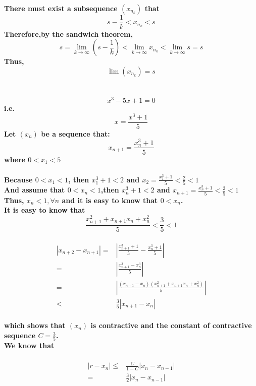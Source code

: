 \documentclass{article}
\begin{document}
        \paragraph{
            There must exist a subsequence $(x_{n_k})$
            that
            $$s-\frac{1}{k}<x_{n_k}<s$$
            Therefore,by the sandwich theorem,
            $$s=\lim_{k\rightarrow \infty} (s-\frac{1}{k})<\lim_{k\rightarrow \infty}x_{n_k}<\lim_{k\rightarrow \infty}s=s$$
            Thus,
            $$\lim(x_{n_k})=s$$
        }
    \section{}
        \paragraph{
            $$x^3-5x+1=0$$
            i.e.
            $$x=\frac{x^3+1}{5}$$
            Let $(x_n)$ be a sequence that:
            $$x_{n+1}=\frac{x_n^3+1}{5}$$
            where $0<x_1<5$
        }
        \paragraph{
            Because $0<x_1<1$, then $x_1^3+1<2$ and $x_{2}=\frac{x_1^3+1}{5}<\frac{2}{5}<1$\\
            And assume that $0<x_n<1$,then $x_n^3+1<2$ and $x_{n+1}=\frac{x_n^3+1}{5}<\frac{2}{5}<1$\\
            Thus, $x_n<1,\forall n$ and it is easy to know that $0<x_n$.\\
            It is easy to know that 
            $$\frac{x_{n+1}^2+x_{n+1}x_n+x_n^2}{5}<\frac{3}{5}<1$$
        }
            \begin{equation*}
                \begin{split}
                    |x_{n+2}-x_{n+1}|=&|\frac{x_{n+1}^3+1}{5}-\frac{x_n^3+1}{5}|\\
                        =&|\frac{x_{n+1}^3-x_n^3}{5}|\\
                        =&|\frac{(x_{n+1}-x_n)(x_{n+1}^2+x_{n+1}x_n+x_n^2)}{5}| \\ 
                        <&\frac{3}{5}|x_{n+1}-x_n|
                \end{split}
            \end{equation*}
        \paragraph{
            which shows that $(x_n)$ is contractive and the constant of contractive sequence $C=\frac{3}{5}$.\\
            We know that 
        }
            \begin{equation*}
                \begin{split}
                    |r-x_n|\leq& \frac{C}{1-C}|x_n-x_{n-1}|\\
                        =&\frac{3}{2}|x_n-x_{n-1}|\\
                \end{split}
            \end{equation*}
\end{document}
